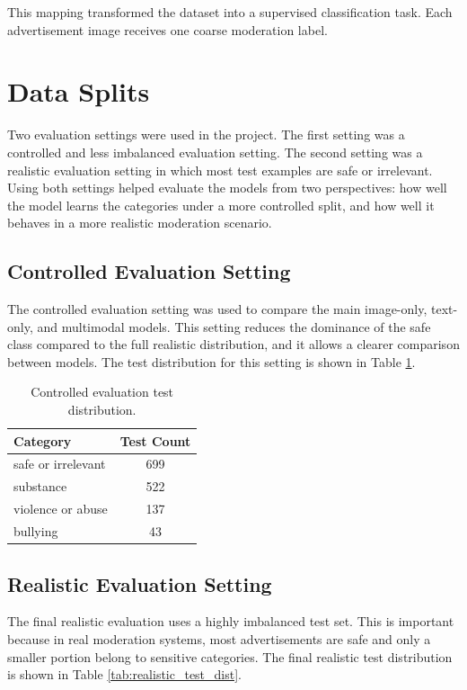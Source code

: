 \documentclass[12pt]{article}
\begin{document}
This mapping transformed the dataset into a supervised classification task. Each advertisement image receives one coarse moderation label.

\section{Data Splits}

Two evaluation settings were used in the project. The first setting was a controlled and less imbalanced evaluation setting. The second setting was a realistic evaluation setting in which most test examples are safe or irrelevant. Using both settings helped evaluate the models from two perspectives: how well the model learns the categories under a more controlled split, and how well it behaves in a more realistic moderation scenario.

\subsection{Controlled Evaluation Setting}

The controlled evaluation setting was used to compare the main image-only, text-only, and multimodal models. This setting reduces the dominance of the safe class compared to the full realistic distribution, and it allows a clearer comparison between models. The test distribution for this setting is shown in Table \ref{tab:controlled_test_dist}.

\begin{table}[H]
\centering
\begin{tabular}{lc}
\toprule
\textbf{Category} & \textbf{Test Count} \\
\midrule
safe or irrelevant & 699 \\
substance & 522 \\
violence or abuse & 137 \\
bullying & 43 \\
\bottomrule
\end{tabular}
\caption{Controlled evaluation test distribution.}
\label{tab:controlled_test_dist}
\end{table}

\subsection{Realistic Evaluation Setting}

The final realistic evaluation uses a highly imbalanced test set. This is important because in real moderation systems, most advertisements are safe and only a smaller portion belong to sensitive categories. The final realistic test distribution is shown in Table \ref{tab:realistic_test_dist}.
\end{document}
